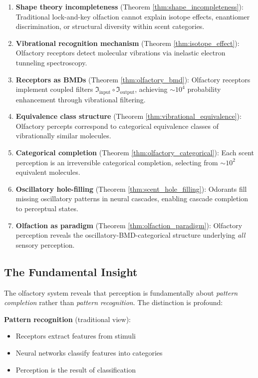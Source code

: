 \documentclass[12pt,a4paper]{article}
\begin{document}
\begin{enumerate}
\item \textbf{Shape theory incompleteness} (Theorem \ref{thm:shape_incompleteness}): Traditional lock-and-key olfaction cannot explain isotope effects, enantiomer discrimination, or structural diversity within scent categories.

\item \textbf{Vibrational recognition mechanism} (Theorem \ref{thm:isotope_effect}): Olfactory receptors detect molecular vibrations via inelastic electron tunneling spectroscopy.

\item \textbf{Receptors as BMDs} (Theorem \ref{thm:olfactory_bmd}): Olfactory receptors implement coupled filters $\Im_{\text{input}} \circ \Im_{\text{output}}$, achieving $\sim 10^4$ probability enhancement through vibrational filtering.

\item \textbf{Equivalence class structure} (Theorem \ref{thm:vibrational_equivalence}): Olfactory percepts correspond to categorical equivalence classes of vibrationally similar molecules.

\item \textbf{Categorical completion} (Theorem \ref{thm:olfactory_categorical}): Each scent perception is an irreversible categorical completion, selecting from $\sim 10^2$ equivalent molecules.

\item \textbf{Oscillatory hole-filling} (Theorem \ref{thm:scent_hole_filling}): Odorants fill missing oscillatory patterns in neural cascades, enabling cascade completion to perceptual states.

\item \textbf{Olfaction as paradigm} (Theorem \ref{thm:olfaction_paradigm}): Olfactory perception reveals the oscillatory-BMD-categorical structure underlying \textit{all} sensory perception.
\end{enumerate}

\subsection{The Fundamental Insight}

The olfactory system reveals that perception is fundamentally about \textit{pattern completion} rather than \textit{pattern recognition}. The distinction is profound:

\textbf{Pattern recognition} (traditional view):
\begin{itemize}
\item Receptors extract features from stimuli
\item Neural networks classify features into categories
\item Perception is the result of classification
\end{itemize}
\end{document}
